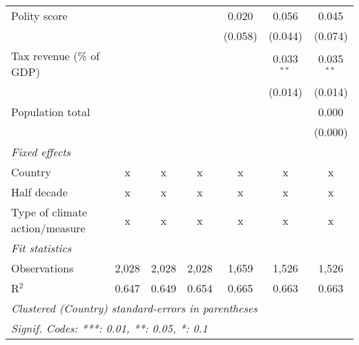 \begin{tabular}{lcccccc}
   Polity score                                                     &         &              &                & 0.020          & 0.056          & 0.045\\   
                                                                    &         &              &                & (0.058)        & (0.044)        & (0.074)\\   
   Tax revenue (\% of GDP)                                          &         &              &                &                & 0.033$^{**}$   & 0.035$^{**}$\\   
                                                                    &         &              &                &                & (0.014)        & (0.014)\\   
   Population total                                                 &         &              &                &                &                & 0.000\\   
                                                                    &         &              &                &                &                & (0.000)\\   
   \emph{Fixed effects}\\
   Country                                                          & x       & x            & x              & x              & x              & x\\  
   Half decade                                                      & x       & x            & x              & x              & x              & x\\  
   Type of climate action/measure                                   & x       & x            & x              & x              & x              & x\\  
   \midrule \emph{Fit statistics}\\
   Observations                                                     & 2,028   & 2,028        & 2,028          & 1,659          & 1,526          & 1,526\\  
   R$^2$                                                            & 0.647   & 0.649        & 0.654          & 0.665          & 0.663          & 0.663\\  
   \midrule
   \multicolumn{7}{l}{\emph{Clustered (Country) standard-errors in parentheses}}\\
   \multicolumn{7}{l}{\emph{Signif. Codes: ***: 0.01, **: 0.05, *: 0.1}}\\
\end{tabular}
\par\endgroup


